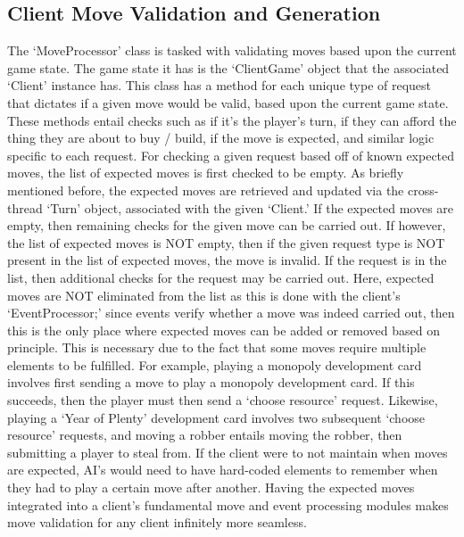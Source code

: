 \documentclass[a4paper,doc,draftfirst]{apa6}
\begin{document}
\subsection{Client Move Validation and Generation}
The ‘MoveProcessor’ class is tasked with validating moves based upon the current game state. The game state it has is the ‘ClientGame’ object that the associated ‘Client’ instance has. This class has a method for each unique type of request that dictates if a given move would be valid, based upon the current game state. These methods entail checks such as if it’s the player’s turn, if they can afford the thing they are about to buy / build, if the move is expected, and similar logic specific to each request. For checking a given request based off of known expected moves, the list of expected moves is first checked to be empty. As briefly mentioned before, the expected moves are retrieved and updated via the cross-thread ‘Turn’ object, associated with the given ‘Client.’ If the expected moves are empty, then remaining checks for the given move can be carried out. If however, the list of expected moves is NOT empty, then if the given request type is NOT present in the list of expected moves, the move is invalid. If the request is in the list, then additional checks for the request may be carried out. Here, expected moves are NOT eliminated from the list as this is done with the client’s ‘EventProcessor;’ since events verify whether a move was indeed carried out, then this is the only place where expected moves can be added or removed based on principle. This is necessary due to the fact that some moves require multiple elements to be fulfilled. For example, playing a monopoly development card involves first sending a move to play a monopoly development card. If this succeeds, then the player must then send a ‘choose resource’ request. Likewise, playing a ‘Year of Plenty’ development card involves two subsequent ‘choose resource’ requests, and moving a robber entails moving the robber, then submitting a player to steal from. If the client were to not maintain when moves are expected, AI’s would need to have hard-coded elements to remember when they had to play a certain move after another. Having the expected moves integrated into a client’s fundamental move and event processing modules makes move validation for any client infinitely more seamless.
\end{document}
